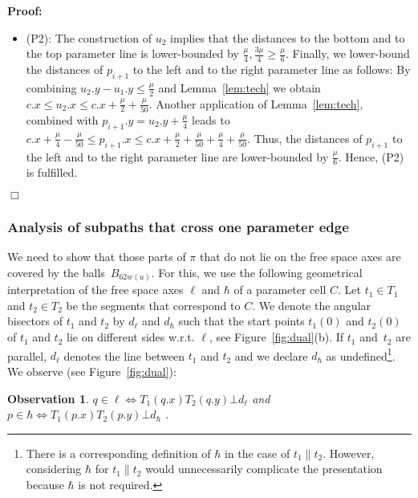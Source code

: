 \documentclass[a4paper,11pt]{article}
\newtheorem{observation}{Observation}
\newenvironment{proof}{\textbf{Proof:}}{\hspace*{0mm}\hfill\ensuremath{\Box}}
\begin{document}
\begin{proof}
\begin{itemize}
\begin{itemize}
\begin{itemize}
					\item (P2): The construction of $u_2$ implies that the distances to the bottom and to the top parameter line is lower-bounded by $\frac{\mu}{4},\frac{3\mu}{4} \geq \frac{\mu}{6}$. Finally, we lower-bound the distances of $p_{i+1}$ to the left and to the right parameter line as follows:  By combining $u_2.y-u_1.y \leq \frac{\mu}{2}$ and Lemma~\ref{lem:tech} we obtain $c.x \leq u_2.x \leq c.x + \frac{\mu}{2}+\frac{\mu}{50}$. Another application of Lemma~\ref{lem:tech}, combined with $p_{i+1}.y = u_2.y + \frac{\mu}{4}$ leads to $c.x + \frac{\mu}{4}-\frac{\mu}{50} \leq p_{i+1}.x \leq c.x + \frac{\mu}{2}+\frac{\mu}{50} + \frac{\mu}{4} + \frac{\mu}{50}$. Thus, the distances of $p_{i+1}$ to the  left and to the right parameter line are lower-bounded by $\frac{\mu}{6}$. Hence, (P2) is fulfilled.
				\end{itemize}
		\end{itemize}
\end{itemize}
\end{proof}


\subsubsection{Analysis of subpaths that cross one parameter edge}\label{subsec:anaOneCrossing}
	We need to show that those parts of $\pi$ that do not lie on the free space axes are covered by the balls~$B_{62w(u)}$. For this, we use the following geometrical interpretation of the free space axes $\ell$ and $\hbar$ of a parameter cell $C$. Let $t_1 \in T_1$ and $t_2 \in T_2$ be the segments that correspond to $C$. We denote the angular bisectors of $t_1$ and $t_2$ by $d_{\ell}$ and $d_{\hbar}$ such that the start points $t_1(0)$ and $t_2(0)$ of $t_1$ and $t_2$ lie on different sides w.r.t. $\ell$, see Figure~\ref{fig:dual}(b). If $t_1$ and~$t_2$ are parallel, $d_{\ell}$ denotes the line between $t_1$ and $t_2$ and we declare $d_{\hbar}$ as undefined\footnote{There is a corresponding definition of $\hbar$ in the case of $t_1 \parallel t_2$. However, considering $\hbar$ for $t_1 \parallel t_2$ would unnecessarily complicate the presentation because $\hbar$ is not required.}. We observe (see Figure~\ref{fig:dual}):
	
\begin{observation}\label{obs:dual}
	$q \in \ell \Leftrightarrow T_1(q.x)T_2(q.y) \bot d_{\ell}$ and $p \in \hbar \Leftrightarrow T_1(p.x)T_2(p.y) \bot d_{\hbar}$ .
\end{observation}
\end{document}
